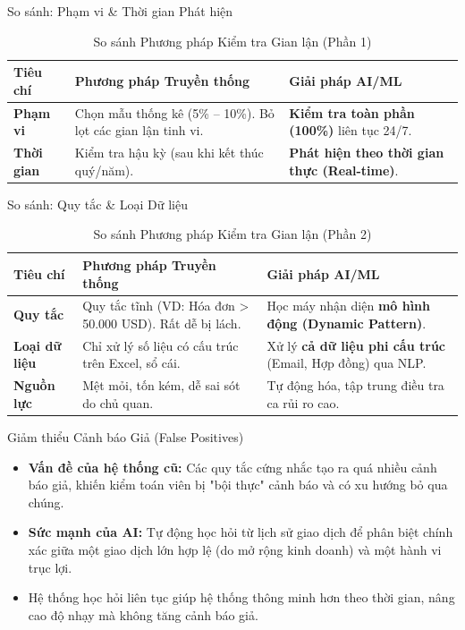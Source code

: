 \documentclass[aspectratio=169]{beamer}
\begin{document}
\begin{frame}{So sánh: Phạm vi \& Thời gian Phát hiện}
    \begin{table}[]
        \centering
        \begin{tabularx}{\textwidth}{|l|X|X|}
        \hline
        \textbf{Tiêu chí} & \textbf{Phương pháp Truyền thống} & \textbf{Giải pháp AI/ML} \\ \hline
        \textbf{Phạm vi} & Chọn mẫu thống kê (5\% – 10\%). Bỏ lọt các gian lận tinh vi. & \textbf{Kiểm tra toàn phần (100\%)} liên tục 24/7. \\ \hline
        \textbf{Thời gian} & Kiểm tra hậu kỳ (sau khi kết thúc quý/năm). & \textbf{Phát hiện theo thời gian thực (Real-time)}. \\ \hline
        \end{tabularx}
        \caption{So sánh Phương pháp Kiểm tra Gian lận (Phần 1)}
    \end{table}
\end{frame}

\begin{frame}{So sánh: Quy tắc \& Loại Dữ liệu}
    \begin{table}[]
        \centering
        \begin{tabularx}{\textwidth}{|l|X|X|}
        \hline
        \textbf{Tiêu chí} & \textbf{Phương pháp Truyền thống} & \textbf{Giải pháp AI/ML} \\ \hline
        \textbf{Quy tắc} & Quy tắc tĩnh (VD: Hóa đơn > 50.000 USD). Rất dễ bị lách. & Học máy nhận diện \textbf{mô hình động (Dynamic Pattern)}. \\ \hline
        \textbf{Loại dữ liệu} & Chỉ xử lý số liệu có cấu trúc trên Excel, sổ cái. & Xử lý \textbf{cả dữ liệu phi cấu trúc} (Email, Hợp đồng) qua NLP. \\ \hline
        \textbf{Nguồn lực} & Mệt mỏi, tốn kém, dễ sai sót do chủ quan. & Tự động hóa, tập trung điều tra ca rủi ro cao. \\ \hline
        \end{tabularx}
        \caption{So sánh Phương pháp Kiểm tra Gian lận (Phần 2)}
    \end{table}
\end{frame}

\begin{frame}{Giảm thiểu Cảnh báo Giả (False Positives)}
    \begin{itemize}
        \item \textbf{Vấn đề của hệ thống cũ:} Các quy tắc cứng nhắc tạo ra quá nhiều cảnh báo giả, khiến kiểm toán viên bị "bội thực" cảnh báo và có xu hướng bỏ qua chúng.
        \item \textbf{Sức mạnh của AI:} Tự động học hỏi từ lịch sử giao dịch để phân biệt chính xác giữa một giao dịch lớn hợp lệ (do mở rộng kinh doanh) và một hành vi trục lợi.
        \item Hệ thống học hỏi liên tục giúp hệ thống thông minh hơn theo thời gian, nâng cao độ nhạy mà không tăng cảnh báo giả.
    \end{itemize}
\end{frame}
\end{document}
